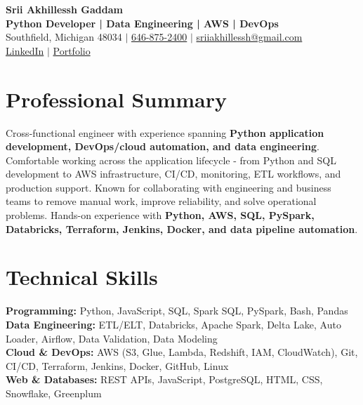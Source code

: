 \documentclass[letterpaper,10pt]{article}
\begin{document}
\fontsize{9.35pt}{10.45pt}\selectfont

\begin{center}
    {\LARGE \textbf{Srii Akhillessh Gaddam}} \\[-1pt]
    \textbf{Python Developer | Data Engineering | AWS | DevOps} \\[2pt]
    Southfield, Michigan 48034 $|$
    \href{tel:6468752400}{646-875-2400} $|$
    \href{mailto:sriiakhillessh@gmail.com}{sriiakhillessh@gmail.com} \\[1pt]
    \href{https://www.linkedin.com/in/srii-akhiilessh-gaddam-b48668191/}{LinkedIn} $|$
    \href{https://sriiakhillesshg.github.io/portfolio/}{Portfolio}
\end{center}
\vspace{-8pt}

\section{Professional Summary}
\small{Cross-functional engineer with experience spanning \textbf{Python application development, DevOps/cloud automation, and data engineering}. Comfortable working across the application lifecycle - from Python and SQL development to AWS infrastructure, CI/CD, monitoring, ETL workflows, and production support. Known for collaborating with engineering and business teams to remove manual work, improve reliability, and solve operational problems. Hands-on experience with \textbf{Python, AWS, SQL, PySpark, Databricks, Terraform, Jenkins, Docker, and data pipeline automation}.}

\section{Technical Skills}
\small{
\textbf{Programming:} Python, JavaScript, SQL, Spark SQL, PySpark, Bash, Pandas \\
\textbf{Data Engineering:} ETL/ELT, Databricks, Apache Spark, Delta Lake, Auto Loader, Airflow, Data Validation, Data Modeling \\
\textbf{Cloud \& DevOps:} AWS (S3, Glue, Lambda, Redshift, IAM, CloudWatch), Git, CI/CD, Terraform, Jenkins, Docker, GitHub, Linux \\
\textbf{Web \& Databases:} REST APIs, JavaScript, PostgreSQL, HTML, CSS, Snowflake, Greenplum
}
\end{document}
